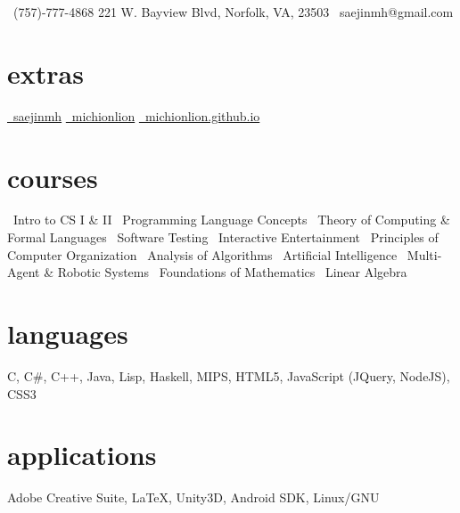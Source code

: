 \documentclass[]{friggeri-cv}
\begin{document}
       {\faMobilePhone\ (757)-777-4868 \hspace{1cm} 221 W. Bayview Blvd, Norfolk, VA, 23503 \hspace{1cm} \faEnvelope\ saejinmh@gmail.com}

\begin{aside}
  \section{extras}
    \href{https://www.linkedin.com/in/saejinmh}{\faLinkedin\ saejinmh}\vspace{0.03cm}
    \href{https://github.com/Michionlion}{\faGithub\ michionlion}\vspace{0.03cm}
    \href{https://michionlion.github.io}{\faGlobe\ michionlion.github.io}\vspace{0.03cm}
  \section{courses}
	\bullet\ Intro to CS I \& II\vspace{0.1cm}
	\bullet\ Programming Language Concepts\vspace{0.1cm}
	\bullet\ Theory of Computing \& Formal Languages\vspace{0.1cm}	
	\bullet\ Software Testing\vspace{0.1cm}
	\bullet\ Interactive Entertainment\vspace{0.1cm}
	\bullet\ Principles of Computer Organization\vspace{0.1cm}
    \bullet\ Analysis of Algorithms\vspace{0.1cm}
    \bullet\ Artificial Intelligence\vspace{0.1cm}
    \bullet\ Multi-Agent \& Robotic Systems\vspace{0.1cm}
    \bullet\ Foundations of Mathematics\vspace{0.1cm}
    \bullet\ Linear Algebra\vspace{0.1cm}
  \section{languages}
    C, C\#, C++, Java, Lisp, Haskell, MIPS, HTML5, JavaScript (JQuery, NodeJS), CSS3\vspace{0.1cm}
  \section{applications}
    Adobe Creative Suite, \LaTeX , Unity3D, Android SDK, Linux/GNU

\end{aside}
\end{document}
